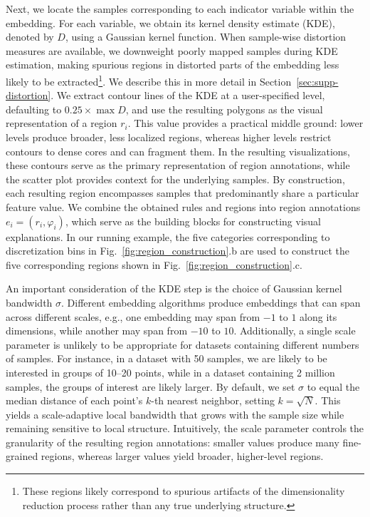 \documentclass[lettersize,journal]{IEEEtran}
\begin{document}
Next, we locate the samples corresponding to each indicator variable within the embedding.
For each variable, we obtain its kernel density estimate (KDE), denoted by $D$, using a Gaussian kernel function.
When sample-wise distortion measures are available, we downweight poorly mapped samples during KDE estimation, making spurious regions in distorted parts of the embedding less likely to be extracted\footnote{These regions likely correspond to spurious artifacts of the dimensionality reduction process rather than any true underlying structure.}. We describe this in more detail in Section~\ref{sec:supp-distortion}.
We extract contour lines of the KDE at a user-specified level, defaulting to $0.25 \times \max D$, and use the resulting polygons as the visual representation of a region $r_i$.
This value provides a practical middle ground: lower levels produce broader, less localized regions, whereas higher levels restrict contours to dense cores and can fragment them.
In the resulting visualizations, these contours serve as the primary representation of region annotations, while the scatter plot provides context for the underlying samples.
By construction, each resulting region encompasses samples that predominantly share a particular feature value.
We combine the obtained rules and regions into region annotations $e_i = \left( r_i, \varphi_i \right)$, which serve as the building blocks for constructing visual explanations.
In our running example, the five categories corresponding to discretization bins in Fig.~\ref{fig:region_construction}.b are used to construct the five corresponding regions shown in Fig.~\ref{fig:region_construction}.c.

An important consideration of the KDE step is the choice of Gaussian kernel bandwidth $\sigma$.
Different embedding algorithms produce embeddings that can span across different scales, e.g., one embedding may span from $-1$ to $1$ along its dimensions, while another may span from $-10$ to $10$.
Additionally, a single scale parameter is unlikely to be appropriate for datasets containing different numbers of samples. For instance, in a dataset with 50 samples, we are likely to be interested in groups of 10--20 points, while in a dataset containing 2 million samples, the groups of interest are likely larger.
By default, we set $\sigma$ to equal the median distance of each point's $k$-th nearest neighbor, setting $k=\sqrt{N}$. This yields a scale-adaptive local bandwidth that grows with the sample size while remaining sensitive to local structure.
Intuitively, the scale parameter controls the granularity of the resulting region annotations: smaller values produce many fine-grained regions, whereas larger values yield broader, higher-level regions.
\end{document}
